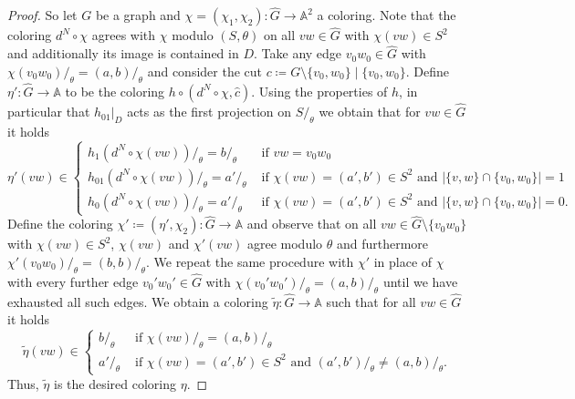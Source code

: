 \documentclass[10pt,a4paper]{amsart}
\newcommand{\str}[1]{\mathbb{#1}}
\begin{document}
\begin{proof}
So let $G$ be a graph and $\chi = (\chi_1,\chi_2) \colon \hat G\to \str A^2$ a coloring. Note that the coloring $d^N\circ \chi$ agrees with $\chi$ modulo
$(S,\theta)$ on all $vw \in \hat G$ with $\chi(vw)\in S^2$ and additionally its image is contained in $D$. 
Take any edge $v_0 w_0 \in \hat G$ with $\chi(v_0 w_0)/_\theta = (a,b)/_\theta$ and consider the cut $c \coloneq G\setminus \{v_0,w_0\} \mid \{v_0,w_0\}$. 
Define $\eta'\colon \hat G\to \str A$ to be the coloring $h \circ (d^N\circ \chi,\hat c)$. Using the properties of $h$, in particular that $h_{01}|_D$ acts as the first projection on $S/_\theta$ we obtain that for $v w \in \hat G$ it holds
\begin{equation*}
    \eta'(v w)  \in
\begin{cases}
    h_{1}(d^N \circ \chi(v w))/_\theta = b/_\theta &\text{ if } v w = v_0 w_0 \\
    h_{01}(d^N \circ \chi(v w))/_\theta =  a'/_\theta &\text{ if } \chi(v w) = (a',b') \in S^2\text{ and } |\{v, w\}\cap \{v_0,w_0\}| = 1 \\
    h_{0}(d^N \circ \chi(v w))/_\theta = a'/_\theta &\text{ if } \chi(v w) = (a',b') \in S^2 \text{ and } |\{v, w\} \cap \{v_0,w_0\}| = 0.
\end{cases}
\end{equation*}
Define the coloring $\chi' \coloneq (\eta',\chi_2)\colon \hat G \to \str A$ and observe that on all $vw \in \hat G\setminus \{v_0 w_0\}$ with $\chi(vw)\in S^2$, $\chi(vw)$ and $\chi'(vw)$ agree modulo $\theta$ and furthermore $\chi'(v_0 w_0)/_\theta = (b,b)/_\theta$. 
We repeat the same procedure with $\chi'$ in place of $\chi$ with every further edge $v_0' w_0' \in \hat G$ with $\chi(v_0' w_0')/_\theta = (a,b)/_\theta$ until we have exhausted all such edges. We obtain a coloring $\tilde \eta \colon \hat G \to \str A$ such that for all $vw \in \hat G$ it holds
\begin{equation*}
        \tilde \eta(v w) \in 
\begin{cases}
    b/_\theta &\text{ if } \chi(v w)/_\theta = (a,b)/_\theta\\
    a'/_\theta &\text{ if } \chi(v w) = (a',b') \in S^2 \text{ and } (a',b')/_\theta \not= (a, b)/_\theta.
\end{cases}
\end{equation*}
Thus, $\tilde \eta$ is the desired coloring $\eta$.
\end{proof}
\end{document}
